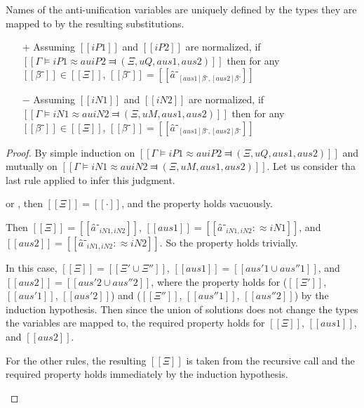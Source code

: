 \begin{observation} \label{obs:names-defined-by-mapping}
    Names of the anti-unification variables are uniquely defined by
    the types they are mapped to by the resulting substitutions. 

    \begin{itemize}
        \item [$+$]  Assuming $[[iP1]]$ and $[[iP2]]$ are normalized,
        if $[[Γ ⊨ iP1 ≈au iP2 ⫤ (Ξ, uQ, aus1, aus2)]]$
        then for any $[[β̂⁻]] \in [[Ξ]]$,
        $[[β̂⁻]] = [[â⁻_{[aus1]β̂⁻, [aus2]β̂⁻}]]$
        \item [$-$]  Assuming $[[iN1]]$ and $[[iN2]]$ are normalized,
        if $[[Γ ⊨ iN1 ≈au iN2 ⫤ (Ξ, uM, aus1, aus2)]]$
        then for any $[[β̂⁻]] \in [[Ξ]]$,
        $[[β̂⁻]] = [[â⁻_{[aus1]β̂⁻, [aus2]β̂⁻}]]$
    \end{itemize}
\end{observation}
\begin{proof}
    By simple induction on $[[Γ ⊨ iP1 ≈au iP2 ⫤ (Ξ, uQ, aus1, aus2)]]$
    and mutually on $[[Γ ⊨ iN1 ≈au iN2 ⫤ (Ξ, uM, aus1, aus2)]]$.
    Let us consider tha last rule applied to infer this judgment.
    \begin{caseof}
        \item {} or ,
        then $[[Ξ]] = [[·]]$, and the property holds vacuously.

        \item {}
        Then  $[[Ξ]] = [[â⁻_{iN1, iN2}]]$,
        $[[aus1]] = [[â⁻_{iN1, iN2} :≈ iN1]]$, and $[[aus2]] = [[â⁻_{iN1, iN2} :≈ iN2]]$.
        So the property holds trivially.

        \item {}
        In this case, $[[Ξ]] = [[Ξ' ∪ Ξ'']]$, $[[aus1]] = [[aus'1 ∪ aus''1]]$, and 
        $[[aus2]] = [[aus'2 ∪ aus''2]]$,
        where the property holds for ($[[Ξ']]$, $[[aus'1]]$, $[[aus'2]]$) and 
        ($[[Ξ'']]$, $[[aus''1]]$, $[[aus''2]]$) by the induction hypothesis.
        Then since the union of solutions does not change the types the variables are mapped to,
        the required property holds for $[[Ξ]]$, $[[aus1]]$, and $[[aus2]]$.

        \item For the other rules, the resulting $[[Ξ]]$ is taken from the recursive call
        and the required property holds immediately by the induction hypothesis.
    \end{caseof}
\end{proof}

